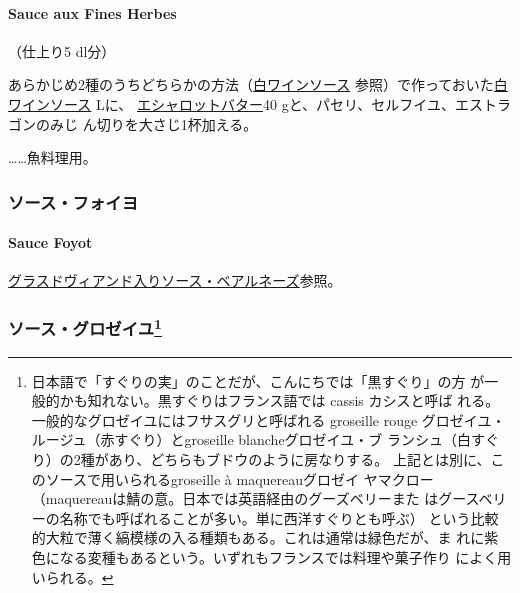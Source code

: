 \begin{recette}
\hypertarget{sauce-aux-fines-herbes-blanche}{%
\paragraph{Sauce aux Fines
Herbes}\label{sauce-aux-fines-herbes-blanche}}


（仕上り5 dl分）

あらかじめ2種のうちどちらかの方法（\protect\hyperlink{sauce-vin-blanc}{白ワインソース}
参照）で作っておいた\protect\hyperlink{sauce-vin-blanc}{白ワインソース}\undemi{}
Lに、 \protect\hyperlink{}{エシャロットバター}40
gと、パセリ、セルフイユ、エストラゴンのみじ
ん切りを大さじ1\undemi{}杯加える。

\ldots{}\ldots{}魚料理用。

\maeaki

\hypertarget{ux30bdux30fcux30b9ux30d5ux30a9ux30a4ux30e8}{%
\subsubsection{ソース・フォイヨ}\label{ux30bdux30fcux30b9ux30d5ux30a9ux30a4ux30e8}}

\hypertarget{sauce-foyot}{%
\paragraph{Sauce Foyot}\label{sauce-foyot}}

\protect\hyperlink{sauce-bearnaise-a-la-glace-de-viande}{グラスドヴィアンド入りソース・ベアルネーズ}参照。

\maeaki

\hypertarget{ux30bdux30fcux30b9ux30b0ux30edux30bcux30a4ux30e651}{%
\subsubsection[ソース・グロゼイユ]{\texorpdfstring{ソース・グロゼイユ\footnote{日本語で「すぐりの実」のことだが、こんにちでは「黒すぐり」の方
  が一般的かも知れない。黒すぐりはフランス語では cassis カシスと呼ば
  れる。一般的なグロゼイユにはフサスグリと呼ばれる groseille rouge
  グロゼイユ・ルージュ（赤すぐり）とgroseille blancheグロゼイユ・ブ
  ランシュ（白すぐり）の2種があり、どちらもブドウのように房なりする。
  上記とは別に、このソースで用いられるgroseille à maquereauグロゼイ
  ヤマクロー（maquereauは鯖の意。日本では英語経由のグーズベリーまた
  はグースベリーの名称でも呼ばれることが多い。単に西洋すぐりとも呼ぶ）
  という比較的大粒で薄く縞模様の入る種類もある。これは通常は緑色だが、ま
  れに紫色になる変種もあるという。いずれもフランスでは料理や菓子作り
  によく用いられる。}}{ソース・グロゼイユ}}\label{ux30bdux30fcux30b9ux30b0ux30edux30bcux30a4ux30e651}}


\end{recette}
